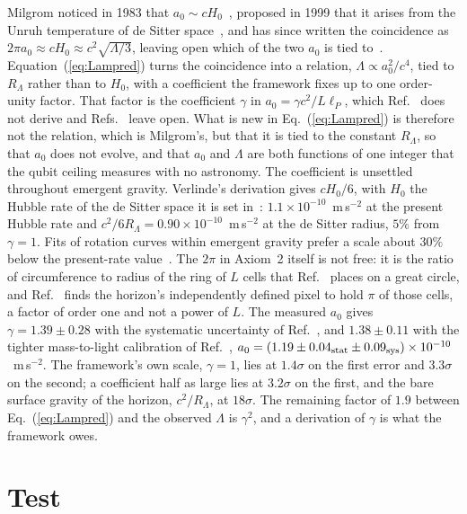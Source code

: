 \documentclass[aps,prd,twocolumn,superscriptaddress,nofootinbib,showkeys]{revtex4-2}
\begin{document}
Milgrom noticed in 1983 that $a_0\sim cH_0$~\cite{milgrom1983}, proposed in 1999 that it arises from the Unruh temperature of de Sitter space~\cite{milgrom1999}, and has since written the coincidence as $2\pi a_0\approx cH_0\approx c^2\sqrt{\Lambda/3}$, leaving open which of the two $a_0$ is tied to~\cite{milgrom2020}. Equation~(\ref{eq:Lampred}) turns the coincidence into a relation, $\Lambda\propto a_0^2/c^4$, tied to $R_\Lambda$ rather than to $H_0$, with a coefficient the framework fixes up to one order-unity factor. That factor is the coefficient $\gamma$ in $a_0 = \gamma c^2/L\ell_P$, which Ref.~\cite{korytko2026} does not derive and Refs.~\cite{korytko2026c,korytko2026d} leave open. What is new in Eq.~(\ref{eq:Lampred}) is therefore not the relation, which is Milgrom's, but that it is tied to the constant $R_\Lambda$, so that $a_0$ does not evolve, and that $a_0$ and $\Lambda$ are both functions of one integer that the qubit ceiling measures with no astronomy. The coefficient is unsettled throughout emergent gravity. Verlinde's derivation gives $cH_0/6$, with $H_0$ the Hubble rate of the de Sitter space it is set in~\cite{verlinde2017}: $1.1\times10^{-10}$~m\,s$^{-2}$ at the present Hubble rate and $c^2/6R_\Lambda = 0.90\times10^{-10}$~m\,s$^{-2}$ at the de Sitter radius, $5\%$ from $\gamma = 1$. Fits of rotation curves within emergent gravity prefer a scale about $30\%$ below the present-rate value~\cite{yoon2023,yoon2025}. The $2\pi$ in Axiom~2 itself is not free: it is the ratio of circumference to radius of the ring of $L$ cells that Ref.~\cite{korytko2026c} places on a great circle, and Ref.~\cite{korytko2026d} finds the horizon's independently defined pixel to hold $\pi$ of those cells, a factor of order one and not a power of $L$. The measured $a_0$ gives $\gamma = 1.39\pm0.28$ with the systematic uncertainty of Ref.~\cite{mcgaugh2016}, and $1.38\pm0.11$ with the tighter mass-to-light calibration of Ref.~\cite{desmond2023}, $a_0 = (1.19\pm0.04_{\rm stat}\pm0.09_{\rm sys})\times10^{-10}$~m\,s$^{-2}$. The framework's own scale, $\gamma = 1$, lies at $1.4\sigma$ on the first error and $3.3\sigma$ on the second; a coefficient half as large lies at $3.2\sigma$ on the first, and the bare surface gravity of the horizon, $c^2/R_\Lambda$, at $18\sigma$. The remaining factor of $1.9$ between Eq.~(\ref{eq:Lampred}) and the observed $\Lambda$ is $\gamma^2$, and a derivation of $\gamma$ is what the framework owes.

\section{Test}
\label{sec:test}
\end{document}
